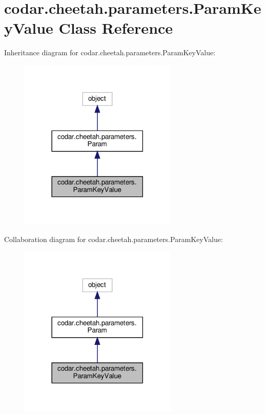\hypertarget{classcodar_1_1cheetah_1_1parameters_1_1_param_key_value}{}\section{codar.\+cheetah.\+parameters.\+Param\+Key\+Value Class Reference}
\label{classcodar_1_1cheetah_1_1parameters_1_1_param_key_value}


Inheritance diagram for codar.\+cheetah.\+parameters.\+Param\+Key\+Value\+:
\nopagebreak
\begin{figure}[H]
\begin{center}
\leavevmode
\includegraphics[width=213pt]{classcodar_1_1cheetah_1_1parameters_1_1_param_key_value__inherit__graph}
\end{center}
\end{figure}


Collaboration diagram for codar.\+cheetah.\+parameters.\+Param\+Key\+Value\+:
\nopagebreak
\begin{figure}[H]
\begin{center}
\leavevmode
\includegraphics[width=213pt]{classcodar_1_1cheetah_1_1parameters_1_1_param_key_value__coll__graph}
\end{center}
\end{figure}
